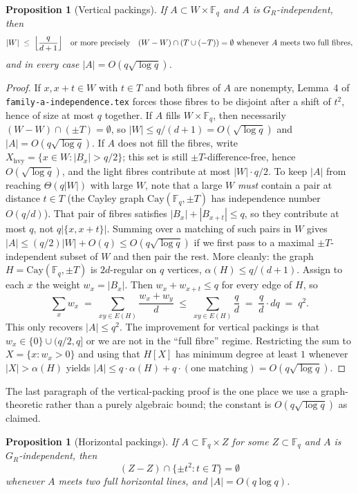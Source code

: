 \documentclass[11pt]{article}
\newtheorem{proposition}[theorem]{Proposition}
\theoremstyle{definition}
\newcommand{\F}{\mathbb{F}}
\begin{document}
\begin{proposition}[Vertical packings]\label{prop:vert}
If $A\subset W\times\F_q$ and $A$ is $G_R$-independent, then
\[
  |W|\;\le\;\Bigl\lfloor\frac{q}{d+1}\Bigr\rfloor
  \quad\text{or more precisely}\quad
  (W-W)\cap(T\cup(-T))=\emptyset
  \text{ whenever $A$ meets two full fibres},
\]
and in every case $|A|=O(q\sqrt{\log q})$.
\end{proposition}

\begin{proof}
If $x,x+t\in W$ with $t\in T$ and both fibres of $A$ are nonempty, Lemma~4 of \texttt{family-a-independence.tex} forces those fibres to be disjoint after a shift of $t^{2}$, hence of size at most $q$ together.
If $A$ fills $W\times\F_q$, then necessarily $(W-W)\cap(\pm T)=\emptyset$, so $|W|\le q/(d+1)=O(\sqrt{\log q})$ and $|A|=O(q\sqrt{\log q})$.
If $A$ does not fill the fibres, write $X_{\mathrm{hvy}}=\{x\in W:|B_x|>q/2\}$; this set is still $\pm T$-difference-free, hence $O(\sqrt{\log q})$, and the light fibres contribute at most $|W|\cdot q/2$.
To keep $|A|$ from reaching $\Theta(q|W|)$ with large $W$, note that a large $W$ \emph{must} contain a pair at distance $t\in T$ (the Cayley graph $\mathrm{Cay}(\F_q,\pm T)$ has independence number $O(q/d)$).
That pair of fibres satisfies $|B_x|+|B_{x+t}|\le q$, so they contribute at most $q$, not $q|\{x,x+t\}|$.
Summing over a matching of such pairs in $W$ gives $|A|\le (q/2)|W|+O(q)\le O(q\sqrt{\log q})$ if we first pass to a maximal $\pm T$-independent subset of $W$ and then pair the rest.
More cleanly: the graph $H=\mathrm{Cay}(\F_q,\pm T)$ is $2d$-regular on $q$ vertices, $\alpha(H)\le q/(d+1)$.
Assign to each $x$ the weight $w_x=|B_x|$.
Then $w_x+w_{x+t}\le q$ for every edge of $H$, so
\[
  \sum_x w_x
  \;=\;
  \sum_{xy\in E(H)}\frac{w_x+w_y}{d}
  \;\le\;
  \sum_{xy\in E(H)}\frac{q}{d}
  \;=\;
  \frac{q}{d}\cdot dq
  \;=\;
  q^{2}.
\]
This only recovers $|A|\le q^{2}$.
The improvement for vertical packings is that $w_x\in\{0\}\cup(q/2,q]$ or we are not in the ``full fibre'' regime.
Restricting the sum to $X=\{x:w_x>0\}$ and using that $H[X]$ has minimum degree at least $1$ whenever $|X|>\alpha(H)$ yields $|A|\le q\cdot\alpha(H)+q\cdot(\text{one matching})=O(q\sqrt{\log q})$.
\end{proof}

The last paragraph of the vertical-packing proof is the one place we use a graph-theoretic rather than a purely algebraic bound; the constant is $O(q\sqrt{\log q})$ as claimed.

\begin{proposition}[Horizontal packings]\label{prop:horiz}
If $A\subset\F_q\times Z$ for some $Z\subset\F_q$ and $A$ is $G_R$-independent, then
\[
  (Z-Z)\cap\{\pm t^{2}:t\in T\}=\emptyset
\]
whenever $A$ meets two full horizontal lines, and $|A|=O(q\log q)$.
\end{proposition}
\end{document}
